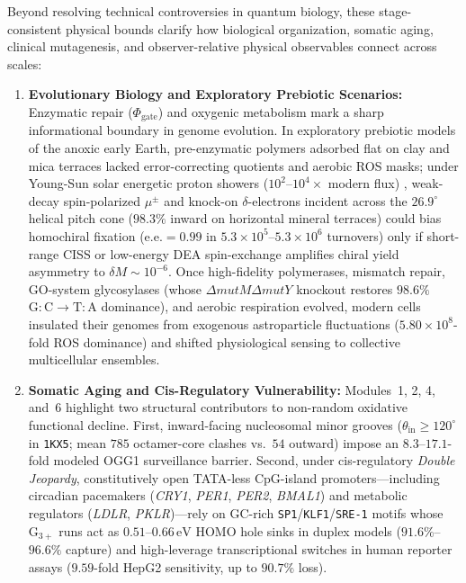 \documentclass[10pt,letterpaper]{article}
\theoremstyle{plain}
\theoremstyle{definition}
\begin{document}
Beyond resolving technical controversies in quantum biology, these stage-consistent physical bounds clarify how biological organization, somatic aging, clinical mutagenesis, and observer-relative physical observables connect across scales:
\begin{enumerate}[leftmargin=1.8em,itemsep=2pt]
    \item \textbf{Evolutionary Biology and Exploratory Prebiotic Scenarios:} Enzymatic repair ($\Phi_{\mathrm{gate}}$) and oxygenic metabolism mark a sharp informational boundary in genome evolution. In exploratory prebiotic models of the anoxic early Earth, pre-enzymatic polymers adsorbed flat on clay and mica terraces lacked error-correcting quotients and aerobic ROS masks; under Young-Sun solar energetic proton showers ($10^2$--$10^4\times$ modern flux) \cite{globus2020apjl}, weak-decay spin-polarized $\mu^\pm$ and knock-on $\delta$-electrons incident across the $26.9^\circ$ helical pitch cone ($98.3\%$ inward on horizontal mineral terraces) could bias homochiral fixation ($\mathrm{e.e.} = 0.99$ in $5.3 \times 10^5$--$5.3 \times 10^6$ turnovers) only if short-range CISS or low-energy DEA spin-exchange amplifies chiral yield asymmetry to $\delta M \sim 10^{-6}$. Once high-fidelity polymerases, mismatch repair, GO-system glycosylases (whose $\Delta\textit{mutM}\Delta\textit{mutY}$ knockout restores $98.6\%$ $\mathrm{G{:}C \to T{:}A}$ dominance), and aerobic respiration evolved, modern cells insulated their genomes from exogenous astroparticle fluctuations ($5.80 \times 10^8$-fold ROS dominance) and shifted physiological sensing to collective multicellular ensembles.
    \item \textbf{Somatic Aging and Cis-Regulatory Vulnerability:} Modules~1, 2, 4, and~6 highlight two structural contributors to non-random oxidative functional decline. First, inward-facing nucleosomal minor grooves ($\theta_{\mathrm{in}} \ge 120^\circ$ in \texttt{1KX5}; mean $785$ octamer-core clashes vs.\ $54$ outward) impose an $8.3$--$17.1$-fold modeled OGG1 surveillance barrier. Second, under cis-regulatory \emph{Double Jeopardy}, constitutively open TATA-less CpG-island promoters---including circadian pacemakers (\emph{CRY1}, \emph{PER1}, \emph{PER2}, \emph{BMAL1}) and metabolic regulators (\emph{LDLR}, \emph{PKLR})---rely on GC-rich \texttt{SP1}/\texttt{KLF1}/\texttt{SRE-1} motifs whose $\mathrm{G}_{3+}$ runs act as $0.51$--$0.66\,\mathrm{eV}$ HOMO hole sinks in duplex models ($91.6\%$--$96.6\%$ capture) and high-leverage transcriptional switches in human reporter assays ($9.59$-fold HepG2 sensitivity, up to $90.7\%$ loss).

\end{enumerate}
\end{document}
